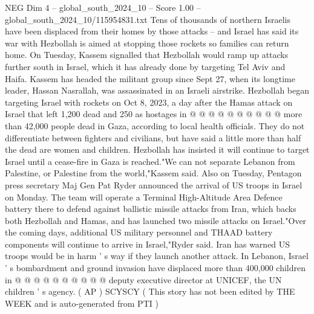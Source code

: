 \begin{textsample}{NEG Dim 4 – global\_south\_2024\_10 – Score 1.00 – global\_south\_2024\_10/115954831.txt}
Tens of thousands of northern Israelis have been displaced from their homes by those attacks -- and Israel has said its war with Hezbollah is aimed at stopping those rockets so families can return home.
On Tuesday, Kassem signalled that Hezbollah would ramp up attacks further south in Israel, which it has already done by targeting Tel Aviv and Haifa.
Kassem has headed the militant group since Sept 27, when its longtime leader, Hassan Nasrallah, was assassinated in an Israeli airstrike.
Hezbollah began targeting Israel with rockets on Oct 8, 2023, a day after the Hamas attack on Israel that left 1,200 dead and 250 as hostages in @ @ @ @ @ @ @ @ @ @ more than 42,000 people dead in Gaza, according to local health officials.
They do not differentiate between fighters and civilians, but have said a little more than half the dead are women and children.
Hezbollah has insisted it will continue to target Israel until a cease-fire in Gaza is reached."We can not separate Lebanon from Palestine, or Palestine from the world,"Kassem said.
Also on Tuesday, Pentagon press secretary Maj Gen Pat Ryder announced the arrival of US troops in Israel on Monday.
The team will operate a Terminal High-Altitude Area Defence battery there to defend against ballistic missile attacks from Iran, which backs both Hezbollah and Hamas, and has launched two missile attacks on Israel."Over the coming days, additional US military personnel and THAAD battery components will continue to arrive in Israel,"Ryder said.
Iran has warned US troops would be in harm ' s way if they launch another attack.
In Lebanon, Israel ' s bombardment and ground invasion have displaced more than 400,000 children in @ @ @ @ @ @ @ @ @ @ deputy executive director at UNICEF, the UN children ' s agency. ( AP ) SCYSCY ( This story has not been edited by THE WEEK and is auto-generated from PTI )

\end{textsample}
